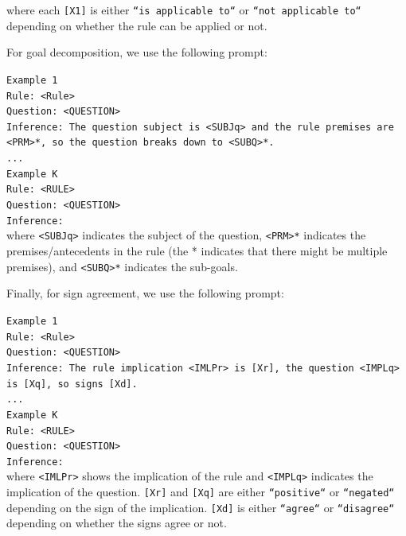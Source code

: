 \documentclass[11pt]{article}
\begin{document}
where each \texttt{[X1]} is either \texttt{``is applicable to``} or \texttt{``not applicable to``} depending on whether the rule can be applied or not.

For goal decomposition, we use the following prompt:

\indent \texttt{Example 1}\\
\indent \texttt{Rule: <Rule>}\\
\indent \texttt{Question: <QUESTION>}\\
\indent \texttt{Inference: The question subject is <SUBJq> and the rule premises are <PRM>*, so the question breaks down to <SUBQ>*.}\\
\indent \texttt{...}\\
\indent \texttt{Example K}\\
\indent \texttt{Rule: <RULE>}\\
\indent \texttt{Question: <QUESTION>}\\
\indent \texttt{Inference: }\\

where \texttt{<SUBJq>} indicates the subject of the question, \texttt{<PRM>*} indicates the premises/antecedents in the rule (the * indicates that there might be multiple premises), and \texttt{<SUBQ>*} indicates the sub-goals.

Finally, for sign agreement, we use the following prompt:

\indent \texttt{Example 1}\\
\indent \texttt{Rule: <Rule>}\\
\indent \texttt{Question: <QUESTION>}\\
\indent \texttt{Inference: The rule implication <IMLPr> is [Xr], the question <IMPLq> is [Xq], so signs [Xd].}\\
\indent \texttt{...}\\
\indent \texttt{Example K}\\
\indent \texttt{Rule: <RULE>}\\
\indent \texttt{Question: <QUESTION>}\\
\indent \texttt{Inference: }\\

where \texttt{<IMLPr>} shows the implication of the rule and \texttt{<IMPLq>} indicates the implication of the question. \texttt{[Xr]} and \texttt{[Xq]} are either \texttt{``positive``} or \texttt{``negated``} depending on the sign of the implication. \texttt{[Xd]} is either \texttt{``agree``} or \texttt{``disagree``} depending on whether the signs agree or not.
\end{document}
